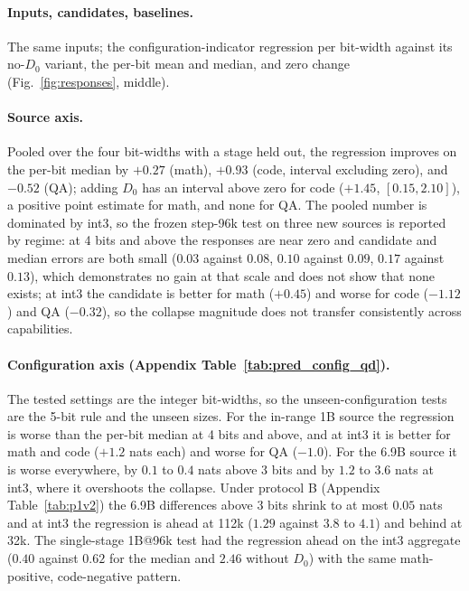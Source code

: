 \paragraph{Inputs, candidates, baselines.} The same inputs; the
configuration-indicator regression per bit-width against its no-$D_0$
variant, the per-bit mean and median, and zero change
(Fig.~\ref{fig:responses}, middle).

\paragraph{Source axis.} Pooled over the four bit-widths with a stage
held out, the regression improves on the per-bit median by $+0.27$
(math), $+0.93$ (code, interval excluding zero), and $-0.52$ (QA);
adding $D_0$ has an interval above zero for code ($+1.45$,
$[0.15,2.10]$), a positive point estimate for math, and none for QA.
The pooled number is dominated by int3, so the frozen step-96k test on
three new sources is reported by regime: at 4 bits and above the
responses are near zero and candidate and median errors are both small
($0.03$ against $0.08$, $0.10$ against $0.09$, $0.17$ against $0.13$),
which demonstrates no gain at that scale and does not show that none
exists; at int3 the candidate is better for math ($+0.45$) and worse
for code ($-1.12$) and QA ($-0.32$), so the collapse magnitude does not
transfer consistently across capabilities.

\paragraph{Configuration axis (Appendix Table~\ref{tab:pred_config_qd}).}
The tested settings are the integer bit-widths, so the
unseen-configuration tests are the 5-bit rule and the unseen sizes. For
the in-range 1B source the regression is worse than the per-bit median
at 4 bits and above, and at int3 it is better for math and code
($+1.2$ nats each) and worse for QA ($-1.0$). For the 6.9B source it is
worse everywhere, by $0.1$ to $0.4$ nats above 3 bits and by $1.2$ to
$3.6$ nats at int3, where it overshoots the collapse. Under protocol B
(Appendix Table~\ref{tab:p1v2}) the 6.9B differences above 3 bits
shrink to at most $0.05$ nats and at int3 the regression is ahead at
112k ($1.29$ against $3.8$ to $4.1$) and behind at 32k. The
single-stage 1B@96k test had the regression ahead on the int3
aggregate ($0.40$ against $0.62$ for the median and $2.46$ without
$D_0$) with the same math-positive, code-negative pattern.

